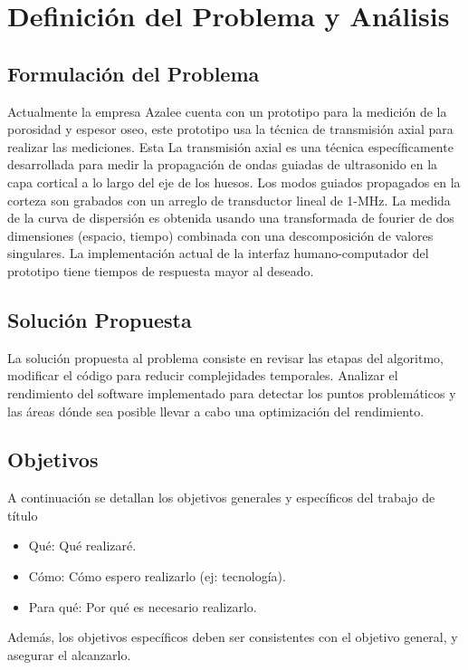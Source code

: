 \chapter{Definición del Problema y Análisis}

\section{Formulación del Problema}

Actualmente la empresa Azalee cuenta con un prototipo para la medición de la porosidad y espesor oseo, este prototipo usa la técnica de transmisión axial para realizar las mediciones. Esta 
La transmisión axial es una técnica específicamente desarrollada para medir la propagación de ondas guiadas de ultrasonido en la capa cortical a lo largo del eje de los huesos. Los modos guiados propagados en la corteza son grabados con un arreglo de transductor lineal de 1-MHz. La medida de la curva de dispersión es obtenida usando una transformada de fourier de dos dimensiones (espacio, tiempo) combinada con una descomposición de valores singulares. La implementación actual de la interfaz humano-computador del prototipo tiene tiempos de respuesta mayor al deseado.

\section{Solución Propuesta}

La solución propuesta al problema consiste en revisar las etapas del algoritmo, modificar el código para reducir complejidades temporales. Analizar el rendimiento del software implementado para detectar los puntos problemáticos y las áreas dónde sea posible llevar a cabo una optimización del rendimiento.

\section{Objetivos}
A continuación se detallan los objetivos generales y específicos del trabajo de título
\begin{itemize}
    \item Qué: Qué realizaré. 
    \item Cómo: Cómo espero realizarlo (ej: tecnología). 
    \item Para qué: Por qué es necesario realizarlo. 
\end{itemize}

Además, los objetivos específicos deben ser consistentes con el objetivo general, y asegurar el alcanzarlo.

